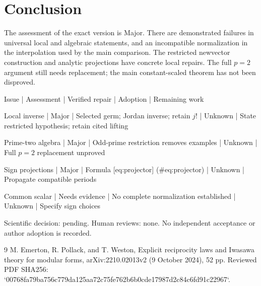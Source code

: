 \documentclass[10pt]{article}
\begin{document}
\section*{Conclusion}
The assessment of the exact version is Major. There are demonstrated failures in universal local and algebraic statements, and an incompatible normalization in the interpolation used by the main comparison. The restricted newvector construction and analytic projections have concrete local repairs. The full \(p=2\) argument still needs replacement; the main constant-scaled theorem has not been disproved.\par
Issue | Assessment | Verified repair | Adoption | Remaining work\par
Local inverse | Major | Selected germ; Jordan inverse; retain \(j!\) | Unknown | State restricted hypothesis; retain cited lifting\par
Prime-two algebra | Major | Odd-prime restriction removes examples | Unknown | Full \(p=2\) replacement unproved\par
Sign projections | Major | Formula [eq:projector] (\#eq:projector) | Unknown | Propagate compatible periods\par
Common scalar | Needs evidence | No complete normalization established | Unknown | Specify sign choices\par
Scientific decision: pending. Human reviews: none. No independent acceptance or author adoption is recorded.\par
9 M. Emerton, R. Pollack, and T. Weston, Explicit reciprocity laws and Iwasawa theory for modular forms, arXiv:2210.02013v2 (9 October 2024), 52 pp. Reviewed PDF SHA256: `00768fa79ba756c779da125aa72c75fe762b6b0cde17987d2c84c6fd91c22967`.\par
\end{document}
